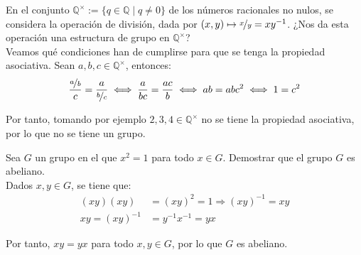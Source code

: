 \begin{ejercicio}\label{ej:2.5}
    En el conjunto $\mathbb{Q}^{\times} := \{q \in \mathbb{Q} \mid q \neq 0\}$ de los números racionales no nulos, se considera la operación de división, dada por $(x, y) \mapsto \nicefrac{x}{y} = xy^{-1}$. ¿Nos da esta operación una estructura de grupo en $\mathbb{Q}^{\times}$?\\

    Veamos qué condiciones han de cumplirse para que se tenga la propiedad asociativa. Sean $a, b, c \in \mathbb{Q}^{\times}$, entonces:
    \begin{equation*}
        \frac{\nicefrac{a}{b}}{c} =  
        \frac{a}{\nicefrac{b}{c}}
        \iff \frac{a}{bc} = \frac{ac}{b}
        \iff ab = abc^2
        \iff 1=c^2
    \end{equation*}

    Por tanto, tomando por ejemplo $2,3,4\in\mathbb{Q}^{\times}$ no se tiene la propiedad asociativa, por lo que no se tiene un grupo.
\end{ejercicio}

\begin{ejercicio}\label{ej:2.6}
    Sea $G$ un grupo en el que $x^2 = 1$ para todo $x \in G$. Demostrar que el grupo $G$ es abeliano.\\

    Dados $x, y \in G$, se tiene que:
    \begin{align*}
        (xy)(xy) &= (xy)^2 = 1 \Longrightarrow (xy)^{-1} = xy\\
        xy=(xy)^{-1} &= y^{-1}x^{-1} = yx
    \end{align*}

    Por tanto, $xy = yx$ para todo $x, y \in G$, por lo que $G$ es abeliano.
\end{ejercicio}

